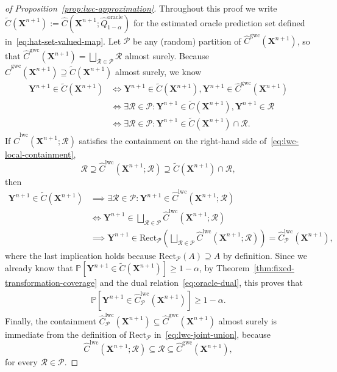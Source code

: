 \begin{proof}[of Proposition~\ref{prop:lwc-approximation}]
Throughout this proof we write $\tilde{C}(\mathbf{X}^{n+1}) := \hat{C}(\mathbf{X}^{n+1}; \hat{Q}^{\mathrm{oracle}}_{1-\alpha})$ for the estimated oracle prediction set defined in~\eqref{eq:hat-set-valued-map}.
Let $\mathcal{P}$ be any (random) partition of $\hat{C}^{\mathrm{gwc}}(\mathbf{X}^{n+1})$, so that $\hat{C}^{\mathrm{gwc}}(\mathbf{X}^{n+1}) = \bigsqcup_{\mathcal{R} \in \mathcal{P}}\mathcal{R}$ almost surely. Because $\hat{C}^{\mathrm{gwc}}(\mathbf{X}^{n+1}) \supseteq \tilde{C}(\mathbf{X}^{n+1})$ almost surely, we know
\begin{align*}
    \mathbf{Y}^{n+1} \in \tilde{C}(\mathbf{X}^{n+1})
    &\iff \mathbf{Y}^{n+1} \in \tilde{C}(\mathbf{X}^{n+1}), \mathbf{Y}^{n+1} \in \hat{C}^{\mathrm{gwc}}(\mathbf{X}^{n+1})\\
    &\iff \exists \mathcal{R} \in \mathcal{P}:  \mathbf{Y}^{n+1} \in \tilde{C}(\mathbf{X}^{n+1}), \mathbf{Y}^{n+1} \in \mathcal{R}\\
    &\iff \exists \mathcal{R} \in \mathcal{P}:  \mathbf{Y}^{n+1} \in \tilde{C}(\mathbf{X}^{n+1}) \cap \mathcal{R}.
\end{align*}
If $\hat{C}^\mathrm{lwc}(\mathbf{X}^{n+1}; \mathcal{R})$ satisfies the containment on the right-hand side of~\eqref{eq:lwc-local-containment},
\[
\mathcal{R}\supseteq \hat{C}^\mathrm{lwc}(\mathbf{X}^{n+1}; \mathcal{R}) \supseteq \tilde{C}(\mathbf{X}^{n+1}) \cap \mathcal{R},
\]
then
\begin{align*}
    \mathbf{Y}^{n+1} \in \tilde{C}(\mathbf{X}^{n+1}) &\implies \exists \mathcal{R}\in \mathcal{P}: \mathbf{Y}^{n+1} \in \hat{C}^\mathrm{lwc}(\mathbf{X}^{n+1}; \mathcal{R})\\
 &\iff \mathbf{Y}^{n+1} \in \bigsqcup_{\mathcal{R} \in \mathcal{P}}\hat{C}^\mathrm{lwc}(\mathbf{X}^{n+1}; \mathcal{R})\\
 &\implies \mathbf{Y}^{n+1} \in \mathrm{Rect}_{\mathcal{P}}\left(\bigsqcup_{\mathcal{R} \in \mathcal{P}}\hat{C}^\mathrm{lwc}(\mathbf{X}^{n+1}; \mathcal{R})\right) = \hat{C}^{\mathrm{lwc}}_{\mathcal{P}}(\mathbf{X}^{n+1}),
\end{align*}
where the last implication holds because $\mathrm{Rect}_{\mathcal{P}}(A) \supseteq A$ by definition.
Since we already know that $\mathbb{P}[\mathbf{Y}^{n+1} \in \tilde{C}(\mathbf{X}^{n+1})] \geq 1-\alpha$, by Theorem~\ref{thm:fixed-transformation-coverage} and the dual relation~\eqref{eq:oracle-dual}, this proves that
\begin{align*}
  \mathbb{P} \left[ \mathbf{Y}^{n+1} \in \hat{C}^\mathrm{lwc}_{\mathcal{P}}(\mathbf{X}^{n+1}) \right] \geq 1-\alpha.
\end{align*}
Finally, the containment $\hat{C}^\mathrm{lwc}_{\mathcal{P}}(\mathbf{X}^{n+1}) \subseteq \hat{C}^\mathrm{gwc}(\mathbf{X}^{n+1})$ almost surely is immediate from the definition of $\mathrm{Rect}_{\mathcal{P}}$ in~\eqref{eq:lwc-joint-union}, because
\[
\hat{C}^\mathrm{lwc}(\mathbf{X}^{n+1}; \mathcal{R}) \subseteq \mathcal{R} \subseteq \hat{C}^\mathrm{gwc}(\mathbf{X}^{n+1}),
\]
for every $\mathcal{R} \in \mathcal{P}$.
\end{proof}

